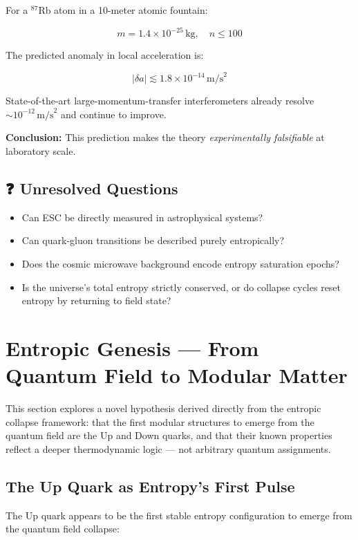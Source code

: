 \documentclass[12pt]{article}
\begin{document}
For a $^{87}$Rb atom in a 10-meter atomic fountain:

\[
m = 1.4 \times 10^{-25} \, \text{kg}, \quad n \leq 100
\]

The predicted anomaly in local acceleration is:

\[
|\delta a| \lesssim 1.8 \times 10^{-14} \, \text{m/s}^2
\]

State-of-the-art large-momentum-transfer interferometers already resolve $\sim 10^{-12} \, \text{m/s}^2$ and continue to improve.

\textbf{Conclusion:} This prediction makes the theory \textit{experimentally falsifiable} at laboratory scale.

\subsection*{❓ Unresolved Questions}

\begin{itemize}
    \item Can ESC be directly measured in astrophysical systems?
    \item Can quark-gluon transitions be described purely entropically?
    \item Does the cosmic microwave background encode entropy saturation epochs?
    \item Is the universe’s total entropy strictly conserved, or do collapse cycles reset entropy by returning to field state?
\end{itemize}


\section{Entropic Genesis — From Quantum Field to Modular Matter}

This section explores a novel hypothesis derived directly from the entropic collapse framework: that the first modular structures to emerge from the quantum field are the Up and Down quarks, and that their known properties reflect a deeper thermodynamic logic — not arbitrary quantum assignments.

\subsection{The Up Quark as Entropy’s First Pulse}

The Up quark appears to be the first stable entropy configuration to emerge from the quantum field collapse:
\end{document}
